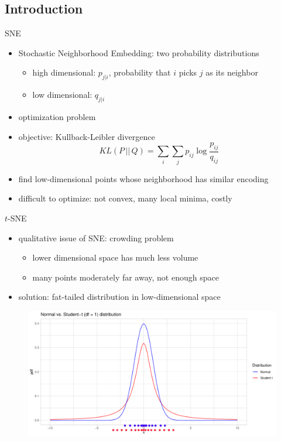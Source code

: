 \documentclass{beamer}
\begin{document}
\subsection{Introduction}

\begin{frame}[fragile]{SNE}
    \begin{itemize}
        \item Stochastic Neighborhood Embedding: two probability distributions
            \begin{itemize}
                \item high dimensional: $p_{j | i}$, probability that $i$ picks $j$ as its neighbor
                \item low dimensional: $q_{j | i}$
            \end{itemize}
        \item optimization problem
        \item objective: Kullback-Leibler divergence
            \[
                KL(P \, || \, Q) = \sum_i \sum_j p_{ij} \log \frac{p_{ij}}{q_{ij}}
            \]
        \item find low-dimensional points whose neighborhood has similar encoding
        \item difficult to optimize: not convex, many local minima, costly
    \end{itemize}
\end{frame}

\begin{frame}[fragile]{$t$-SNE}
    \begin{itemize}
        \item qualitative issue of SNE: crowding problem
            \begin{itemize}
                \item lower dimensional space has much less volume
                \item many points moderately far away, not enough space
            \end{itemize}
        \item solution: fat-tailed distribution in low-dimensional space
    \end{itemize}

    \begin{figure}[h]
        \centering
        \includegraphics[height=.5\textheight]{t_vs_norm}
    \end{figure}
\end{frame}
\end{document}

